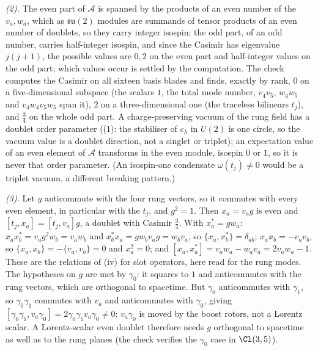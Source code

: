 \emph{(2).} The even part of $\mathcal{A}$ is spanned by the products of an even number of the $v_{a}, w_{a}$, which as $\mathfrak{su}(2)$ modules are summands of tensor products of an even number of doublets, so they carry integer isospin; the odd part, of an odd number, carries half-integer isospin, and since the Casimir has eigenvalue $j(j+1)$, the possible values are $0, 2$ on the even part and half-integer values on the odd part; which values occur is settled by the computation. The check computes the Casimir on all sixteen basis blades and finds, exactly by rank, $0$ on a five-dimensional subspace (the scalars $1$, the total mode number, $v_{4}v_{5}$, $w_{4}w_{5}$ and $v_{4}w_{4}v_{5}w_{5}$ span it), $2$ on a three-dimensional one (the traceless bilinears $t_{j}$), and $\tfrac34$ on the whole odd part. A charge-preserving vacuum of the rung field has a doublet order parameter ((1): the stabiliser of $c_{\lambda}$ in $U(2)$ is one circle, so the vacuum value is a doublet direction, not a singlet or triplet); an expectation value of an even element of $\mathcal{A}$ transforms in the even module, isospin $0$ or $1$, so it is never that order parameter. (An isospin-one condensate $\omega(t_{j}) \ne 0$ would be a triplet vacuum, a different breaking pattern.)

\emph{(3).} Let $g$ anticommute with the four rung vectors, so it commutes with every even element, in particular with the $t_{j}$, and $g^{2} = 1$. Then $x_{a} = v_{a}g$ is even and $[t_{j}, x_{a}] = [t_{j}, v_{a}]g$, a doublet with Casimir $\tfrac34$. With $x_{a}^{*} = g w_{a}$: $x_{a}x_{b}^{*} = v_{a}g^{2}w_{b} = v_{a}w_{b}$ and $x_{b}^{*}x_{a} = gw_{b}v_{a}g = w_{b}v_{a}$, so $\{x_{a}, x_{b}^{*}\} = \delta_{ab}$; $x_{a}x_{b} = -v_{a}v_{b}$, so $\{x_{a}, x_{b}\} = -\{v_{a}, v_{b}\} = 0$ and $x_{a}^{2} = 0$; and $[x_{a}, x_{a}^{*}] = v_{a}w_{a} - w_{a}v_{a} = 2v_{a}w_{a} - 1$. These are the relations of (iv) for slot operators, here read for the rung modes. The hypotheses on $g$ are met by $\gamma_{0}$: it squares to $1$ and anticommutes with the rung vectors, which are orthogonal to spacetime. But $\gamma_{0}$ anticommutes with $\gamma_{1}$, so $\gamma_{0}\gamma_{1}$ commutes with $v_{a}$ and anticommutes with $\gamma_{0}$, giving $[\gamma_{0}\gamma_{1}, v_{a}\gamma_{0}] = 2\gamma_{0}\gamma_{1}v_{a}\gamma_{0} \ne 0$: $v_{a}\gamma_{0}$ is moved by the boost rotors, not a Lorentz scalar. A Lorentz-scalar even doublet therefore needs $g$ orthogonal to spacetime as well as to the rung planes (the check verifies the $\gamma_{0}$ case in $\Cl(3,5)$).

